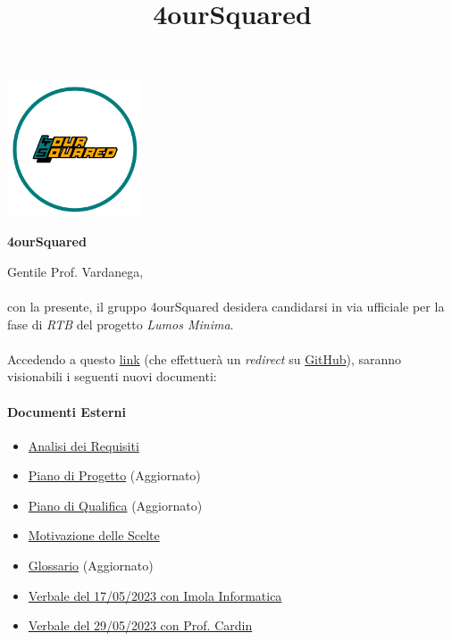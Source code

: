 \documentclass[12pt, a4paper]{article}
\begin{document}
\graphicspath{ {../../template} }
\title{4ourSquared}
\begin{center}
    \includegraphics[width=0.30\textwidth]{4ourSquared_logo}
\end{center}
\begin{center}
    {\Large \textbf{4ourSquared}}\\[24pt]
\end{center}


Gentile Prof. Vardanega,\\\\
con la presente, il gruppo 4ourSquared desidera candidarsi in via ufficiale per la fase di \textit{RTB} del progetto \textit{Lumos Minima}.\\\\
Accedendo a questo \href{https://github.com/4ourSquared/LumosMinima/tree/main/public}{link} (che effettuerà un \textit{redirect} su \href{https://github.com/}{GitHub}), saranno visionabili i seguenti nuovi documenti:
\paragraph{Documenti Esterni}
\begin{itemize}
    \item \href{https://github.com/4ourSquared/LumosMinima/tree/main/public/esterni/analisi_dei_requisiti.pdf}{Analisi dei Requisiti}
    \item \href{https://github.com/4ourSquared/LumosMinima/tree/main/public/esterni/piano_di_progetto.pdf}{Piano di Progetto} (Aggiornato)
    \item \href{https://github.com/4ourSquared/LumosMinima/tree/main/public/esterni/piano_di_qualifica.pdf}{Piano di Qualifica} (Aggiornato)
    \item \href{https://github.com/4ourSquared/LumosMinima/tree/main/public/esterni/motivazione_scelte.pdf}{Motivazione delle Scelte}
    \item \href{https://github.com/4ourSquared/LumosMinima/tree/main/public/esterni/glossario.pdf}{Glossario} (Aggiornato)
    \item \href{https://github.com/4ourSquared/LumosMinima/tree/main/public/esterni/verbali/2023_05_17_E.pdf}{Verbale del 17/05/2023 con Imola Informatica}
    \item \href{https://github.com/4ourSquared/LumosMinima/tree/main/public/esterni/verbali/2023_05_29_E.pdf}{Verbale del 29/05/2023 con Prof. Cardin}
\end{itemize}
\end{document}
